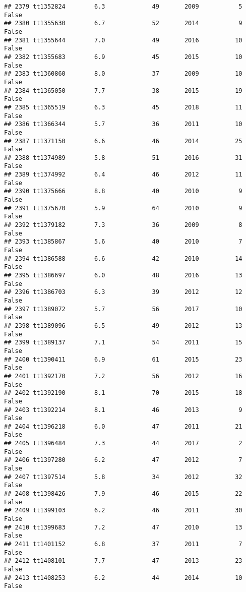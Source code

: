 \documentclass[
]{article}
\begin{document}
\begin{verbatim}
## 2379 tt1352824        6.3             49       2009           5   False
## 2380 tt1355630        6.7             52       2014           9   False
## 2381 tt1355644        7.0             49       2016          10   False
## 2382 tt1355683        6.9             45       2015          10   False
## 2383 tt1360860        8.0             37       2009          10   False
## 2384 tt1365050        7.7             38       2015          19   False
## 2385 tt1365519        6.3             45       2018          11   False
## 2386 tt1366344        5.7             36       2011          10   False
## 2387 tt1371150        6.6             46       2014          25   False
## 2388 tt1374989        5.8             51       2016          31   False
## 2389 tt1374992        6.4             46       2012          11   False
## 2390 tt1375666        8.8             40       2010           9   False
## 2391 tt1375670        5.9             64       2010           9   False
## 2392 tt1379182        7.3             36       2009           8   False
## 2393 tt1385867        5.6             40       2010           7   False
## 2394 tt1386588        6.6             42       2010          14   False
## 2395 tt1386697        6.0             48       2016          13   False
## 2396 tt1386703        6.3             39       2012          12   False
## 2397 tt1389072        5.7             56       2017          10   False
## 2398 tt1389096        6.5             49       2012          13   False
## 2399 tt1389137        7.1             54       2011          15   False
## 2400 tt1390411        6.9             61       2015          23   False
## 2401 tt1392170        7.2             56       2012          16   False
## 2402 tt1392190        8.1             70       2015          18   False
## 2403 tt1392214        8.1             46       2013           9   False
## 2404 tt1396218        6.0             47       2011          21   False
## 2405 tt1396484        7.3             44       2017           2   False
## 2406 tt1397280        6.2             47       2012           7   False
## 2407 tt1397514        5.8             34       2012          32   False
## 2408 tt1398426        7.9             46       2015          22   False
## 2409 tt1399103        6.2             46       2011          30   False
## 2410 tt1399683        7.2             47       2010          13   False
## 2411 tt1401152        6.8             37       2011           7   False
## 2412 tt1408101        7.7             47       2013          23   False
## 2413 tt1408253        6.2             44       2014          10   False

\end{verbatim}
\end{document}
